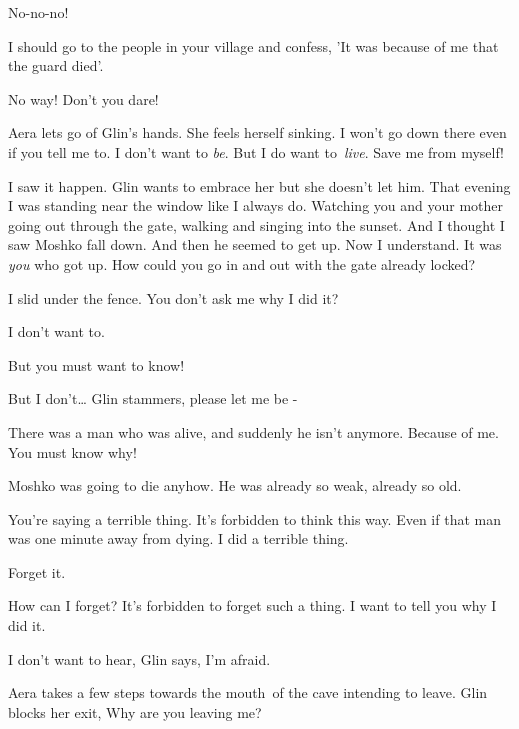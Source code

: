 \documentclass[letterpaper]{article}
\begin{document}
{\textquotedbl}No-no-no!{\textquotedbl}~ 

{\textquotedbl}I should go to the people in your village and confess, 'It was because of me that the guard
died'.{\textquotedbl} 

{\textquotedbl}No way! Don't you dare!{\textquotedbl} ~~~~~~~~~~~~~~~~~~~~~~~~~~~~~~~~~~~~~~~~~~~~ 

Aera lets go of Glin's hands. She feels herself sinking. {\textquotedbl}I won't go down there even if you tell me to. I
don't want to \textit{be}. But I do want to\ \textit{live}. Save me from myself!{\textquotedbl} 

{\textquotedbl}I saw it happen.{\textquotedbl} Glin wants to embrace her but she doesn't let him. {\textquotedbl}That
evening I was standing near the window like I always do. Watching you and your mother going out through the gate,
walking and singing into the sunset. And I thought I saw Moshko fall down. And then he seemed to get up. Now I
understand. It was \textit{you} who got up. How could you go in and out with the gate already locked?{\textquotedbl} 

{\textquotedbl}I slid under the fence. You don't ask me why I did it?{\textquotedbl} 

{\textquotedbl}I don't want to.{\textquotedbl} 

{\textquotedbl}But you must want to know!{\textquotedbl} 

{\textquotedbl}But I don't{\dots}{\textquotedbl} Glin stammers, {\textquotedbl}please let me be -{\textquotedbl} 

{\textquotedbl}There was a man who was alive, and suddenly he isn't anymore. Because of me. You must know
why!{\textquotedbl} 

{\textquotedbl}Moshko was going to die anyhow. He was already so weak, already so old.{\textquotedbl} 

{\textquotedbl}You're saying a terrible thing. It's forbidden to think this way. Even if that man was one minute away
from dying. I did a terrible thing.{\textquotedbl} 

{\textquotedbl}Forget it.{\textquotedbl} 

{\textquotedbl}How can I forget? It's forbidden to forget such a thing. I want to tell you why I did it.{\textquotedbl} 

{\textquotedbl}I don't want to hear,{\textquotedbl} Glin says, {\textquotedbl}I'm afraid.{\textquotedbl}\ 

Aera takes a few steps towards the mouth\textcolor{red}{\ }of the cave intending to leave. Glin blocks her exit,
{\textquotedbl}Why are you leaving me?{\textquotedbl} 
\end{document}

